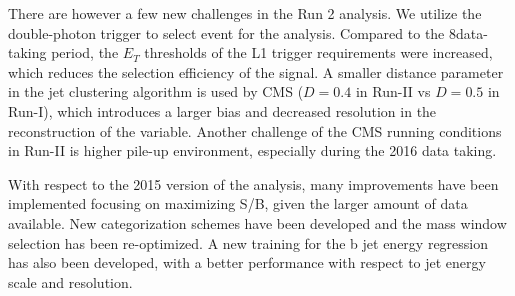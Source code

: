 There are however a few new challenges in the Run 2 analysis.  We utilize the double-photon
trigger to select event for the analysis. Compared to the 8\TeV data-taking period, the $E_{T}$
thresholds of the L1 trigger requirements were increased, which reduces the selection
efficiency of the signal.  
A smaller distance parameter in the jet clustering algorithm is
used by CMS ($D=0.4$ in Run-II vs $D=0.5$ in Run-I), which introduces a larger bias and decreased resolution in the
reconstruction of the \Mjj variable. Another challenge of the CMS running conditions in
Run-II is higher pile-up environment, especially during the 2016 data taking. 

With respect to the 2015 version of the analysis, many improvements have been implemented focusing on 
maximizing S/B, given the larger amount of data available. 
New categorization schemes have been developed and the mass window selection has been re-optimized. 
A new training for the b jet energy regression has also been developed, with a better performance with respect to jet energy scale and resolution. 




